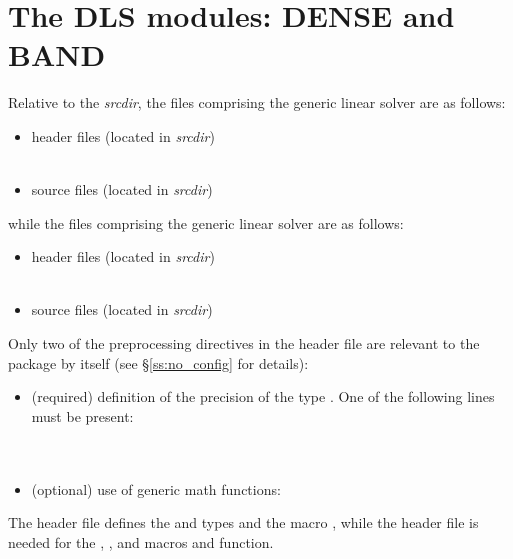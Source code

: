 \section{The DLS modules: DENSE and BAND}\label{s:dls}

Relative to the {\sundials} {\em srcdir}, the files comprising the
{\dense} generic linear solver are as follows:
\begin{itemize}
\item header files (located in {\em srcdir})\\
    \\
     
\item source files (located in {\em srcdir})\\
    
\end{itemize}
while the files comprising the {\band} generic linear solver are as follows:
\begin{itemize}
\item header files (located in {\em srcdir})\\
    \\
     
\item source files (located in {\em srcdir})\\
    
\end{itemize}
Only two of the preprocessing directives in the header file  
are relevant to the {\dense} package by itself (see \S\ref{ss:no_config} for details):
\begin{itemize}
\item (required) definition of the precision of the {\sundials} type . 
  One of the following lines must be present:\\
  \\
  \\
\item (optional) use of generic math functions:
\end{itemize}
The  header file defines the {\sundials}
 and  types and the macro , while the 
 header file is needed for the , , and 
 macros and  function.


